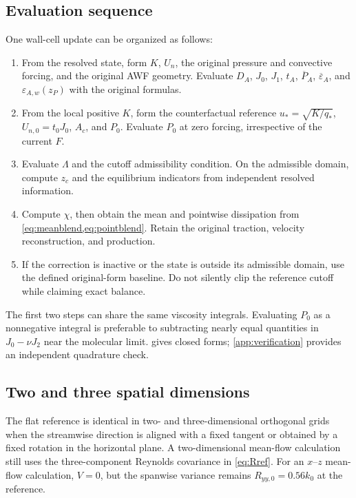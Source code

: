 \documentclass[11pt,a4paper]{article}
\numberwithin{equation}{section}
\newcommand{\eps}{\varepsilon}
\newcommand{\ust}{u_*}
\newcommand{\qs}{q_*}
\newcommand{\avg}[1]{\overline{#1}}
\newcommand{\Aref}{A_c}
\newcommand{\ycut}{z_c}
\newcommand{\EAw}{\eps_{A,w}}
\begin{document}
\subsection{Evaluation sequence}
One wall-cell update can be organized as follows:
\begin{enumerate}
\item From the resolved state, form $K$, $U_n$, the original pressure
and convective forcing, and the original AWF geometry.
Evaluate $D_A$, $J_0$, $J_1$, $t_A$, $\avg P_A$,
$\avg\eps_A$, and $\EAw(z_P)$ with the original formulas.
\item From the local positive $K$, form the counterfactual reference
$\ust=\sqrt{K/\qs}$, $U_{n,0}=t_0J_0$, $\Aref$, and $P_0$.
Evaluate $P_0$ at zero forcing, irrespective of the current $F$.
\item Evaluate $\Lambda$ and the cutoff admissibility condition.
On the admissible domain, compute $\ycut$ and the equilibrium
indicators from independent resolved information.
\item Compute $\chi$, then obtain the mean and pointwise dissipation
from \cref{eq:meanblend,eq:pointblend}. Retain the original traction,
velocity reconstruction, and production.
\item If the correction is inactive or the state is outside its
admissible domain, use the defined original-form baseline. Do not
silently clip the reference cutoff while claiming exact balance.
\end{enumerate}
The first two steps can share the same viscosity integrals.
Evaluating $P_0$ as a nonnegative integral is preferable to subtracting
nearly equal quantities in $J_0-\nu J_2$ near the molecular limit.
 gives closed forms; \cref{app:verification}
provides an independent quadrature check.

\subsection{Two and three spatial dimensions}
The flat reference is identical in two- and three-dimensional orthogonal
grids when the streamwise direction is aligned with a fixed tangent or
obtained by a fixed rotation in the horizontal plane. A two-dimensional
mean-flow calculation still uses the three-component Reynolds covariance
in \cref{eq:Rref}. For an $x$--$z$ mean-flow calculation, $V=0$,
but the spanwise variance remains $R_{yy,0}=0.56k_0$ at the reference.
\end{document}
